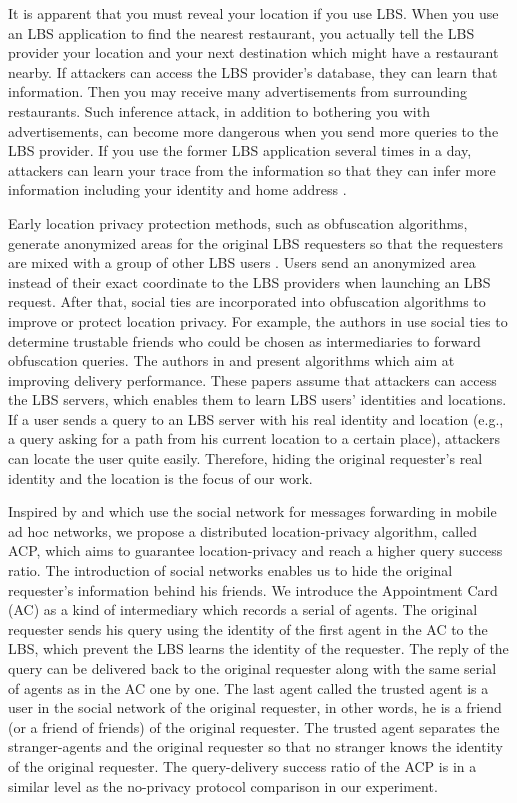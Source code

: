 \documentclass[conference]{IEEEtran}
\begin{document}
It is apparent that you must reveal your location if you use LBS. When you use an LBS application to find the nearest restaurant, you actually tell the LBS provider your location and your next destination which might have a restaurant nearby. If attackers can access the LBS provider's database, they can learn that information. Then you may receive many advertisements from surrounding restaurants. Such inference attack, in addition to bothering you with advertisements, can become more dangerous when you send more queries to the LBS provider. If you use the former LBS application several times in a day, attackers can learn your trace from the information so that they can infer more information including your identity and home address \cite {C23}.

Early location privacy protection methods, such as obfuscation algorithms, generate anonymized areas for the original LBS requesters so that the requesters are mixed with a group of other LBS users \cite{C3} \cite{C21}. Users send an anonymized area instead of their exact coordinate to the LBS providers when launching an LBS request. After that, social ties are incorporated into obfuscation algorithms to improve or protect location privacy. For example, the authors in \cite{C4} use social ties to determine trustable friends who could be chosen as intermediaries to forward obfuscation queries. The authors in \cite{C5} and \cite{C6} present algorithms which aim at improving delivery performance. These papers assume that attackers can access the LBS servers, which enables them to learn LBS users’ identities and locations. If a user sends a query to an LBS server with his real identity and location (e.g., a query asking for a path from his current location to a certain place), attackers can locate the user quite easily. Therefore, hiding the original requester’s real identity and the location is the focus of our work.

Inspired by \cite{5} and \cite{C7} which use the social network for messages forwarding in mobile ad hoc networks, we propose a distributed location-privacy algorithm, called ACP, which aims to guarantee location-privacy and reach a higher query success ratio. The introduction of social networks enables us to hide the original requester's information behind his friends. We introduce the Appointment Card (AC) as a kind of intermediary which records a serial of agents. The original requester sends his query using the identity of the first agent in the AC to the LBS, which prevent the LBS learns the identity of the requester. The reply of the query can be delivered back to the original requester along with the same serial of agents as in the AC one by one. The last agent called the trusted agent is a user in the social network of the original requester, in other words, he is a friend (or a friend of friends) of the original requester. The trusted agent separates the stranger-agents and the original requester so that no stranger knows the identity of the original requester. The query-delivery success ratio of the ACP is in a similar level as the no-privacy protocol comparison in our experiment.
\end{document}
